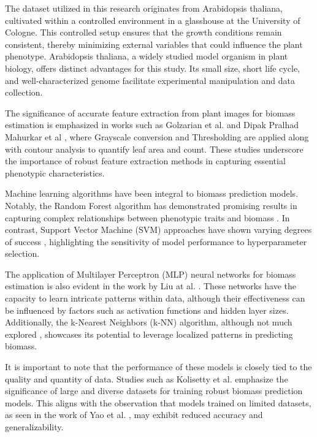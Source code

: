 \documentclass[a4paper,12pt]{report}%
\renewcommand{\\}{\vspace*{0.5\baselineskip} \newline}
\begin{document}
\noindent The dataset utilized in this research originates from Arabidopsis thaliana, cultivated within a controlled environment in a glasshouse at the University of Cologne. This controlled setup ensures that the growth conditions remain consistent, thereby minimizing external variables that could influence the plant phenotype. Arabidopsis thaliana, a widely studied model organism in plant biology, offers distinct advantages for this study. Its small size, short life cycle, and well-characterized genome facilitate experimental manipulation and data collection.\cite{31}

\noindent The significance of accurate feature extraction from plant images for biomass estimation is emphasized in works such as Golzarian et al. \cite{32} and Dipak Pralhad Mahurkar et al \cite{33}, where Grayscale conversion and Thresholding are applied along with contour analysis to quantify leaf area and count. 
These studies underscore the importance of robust feature extraction methods in capturing essential phenotypic characteristics.

\noindent Machine learning algorithms have been integral to biomass prediction models. Notably, the Random Forest algorithm has demonstrated promising results in capturing complex relationships between phenotypic traits and biomass \cite{34}\cite{35}. In contrast, Support Vector Machine (SVM) approaches have shown varying degrees of success \cite{34}\cite{35}, highlighting the sensitivity of model performance to hyperparameter selection.

\noindent The application of Multilayer Perceptron (MLP) neural networks for biomass estimation is also evident in the work by Liu at al. \cite{36}. These networks have the capacity to learn intricate patterns within data, although their effectiveness can be influenced by factors such as activation functions and hidden layer sizes. Additionally, the k-Nearest Neighbors (k-NN) algorithm, although not much explored \cite{37}, showcases its potential to leverage localized patterns in predicting biomass.

\noindent It is important to note that the performance of these models is closely tied to the quality and quantity of data. Studies such as Kolisetty et al. \cite{38} emphasize the significance of large and diverse datasets for training robust biomass prediction models. This aligns with the observation that models trained on limited datasets, as seen in the work of Yao et al. \cite{39} \cite{40}, may exhibit reduced accuracy and generalizability.
\end{document}
